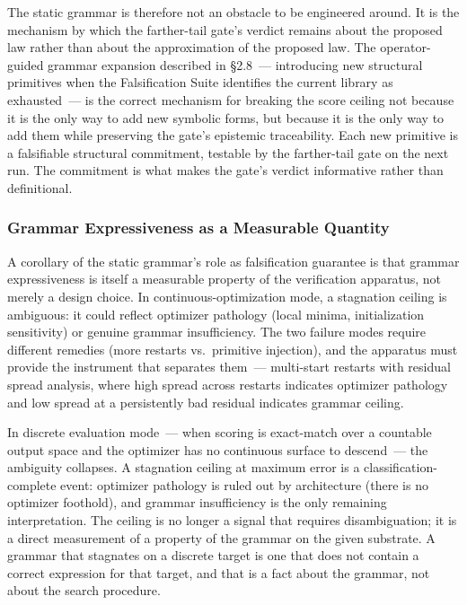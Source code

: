 \documentclass[11pt]{article}
\begin{document}
The static grammar is therefore not an obstacle to be engineered around. It is the mechanism by which the farther-tail gate's verdict remains about the proposed law rather than about the approximation of the proposed law. The operator-guided grammar expansion described in \S2.8~--- introducing new structural primitives when the Falsification Suite identifies the current library as exhausted~--- is the correct mechanism for breaking the score ceiling not because it is the only way to add new symbolic forms, but because it is the only way to add them while preserving the gate's epistemic traceability. Each new primitive is a falsifiable structural commitment, testable by the farther-tail gate on the next run. The commitment is what makes the gate's verdict informative rather than definitional.

\subsubsection*{Grammar Expressiveness as a Measurable Quantity}

A corollary of the static grammar's role as falsification guarantee is that grammar expressiveness is itself a measurable property of the verification apparatus, not merely a design choice. In continuous-optimization mode, a stagnation ceiling is ambiguous: it could reflect optimizer pathology (local minima, initialization sensitivity) or genuine grammar insufficiency. The two failure modes require different remedies (more restarts vs.\ primitive injection), and the apparatus must provide the instrument that separates them~--- multi-start restarts with residual spread analysis, where high spread across restarts indicates optimizer pathology and low spread at a persistently bad residual indicates grammar ceiling.

In discrete evaluation mode~--- when scoring is exact-match over a countable output space and the optimizer has no continuous surface to descend~--- the ambiguity collapses. A stagnation ceiling at maximum error is a classification-complete event: optimizer pathology is ruled out by architecture (there is no optimizer foothold), and grammar insufficiency is the only remaining interpretation. The ceiling is no longer a signal that requires disambiguation; it is a direct measurement of a property of the grammar on the given substrate. A grammar that stagnates on a discrete target is one that does not contain a correct expression for that target, and that is a fact about the grammar, not about the search procedure.
\end{document}
